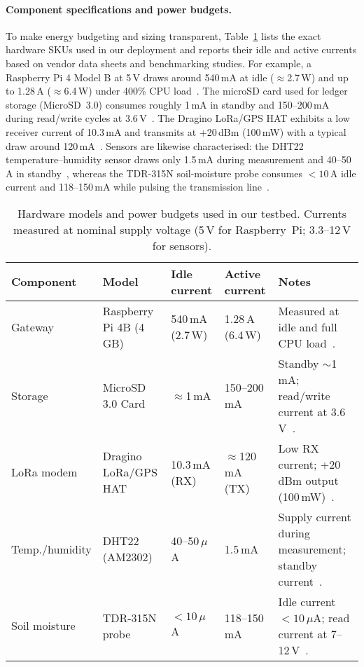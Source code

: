 \documentclass[12pt,onecolumn]{IEEEtran} %
\begin{document}
\paragraph{Component specifications and power budgets.}
To make energy budgeting and sizing transparent, Table~\ref{tab:hw} lists the exact hardware SKUs used in our deployment and reports their idle and active currents based on vendor data sheets and benchmarking studies. For example, a Raspberry Pi 4 Model B at 5\,V draws around 540\,mA at idle ($\approx$2.7\,W) and up to 1.28\,A ($\approx$6.4\,W) under 400\% CPU load~\cite{geerling2020powerbench}. The microSD card used for ledger storage (MicroSD~3.0) consumes roughly 1\,mA in standby and 150–200\,mA during read/write cycles at 3.6\,V~\cite{sanmina2017microsd}. The Dragino LoRa/GPS HAT exhibits a low receiver current of 10.3\,mA and transmits at +20\,dBm (100\,mW) with a typical draw around 120\,mA~\cite{dragino2019lorahat}. Sensors are likewise characterised: the DHT22 temperature–humidity sensor draws only 1.5\,mA during measurement and 40–50\,\textmu A in standby~\cite{dht22datasheet}, whereas the TDR-315N soil-moisture probe consumes $<10$\,\textmu A idle current and 118–150\,mA while pulsing the transmission line~\cite{acclima2017tdr315n}.

\begingroup
\setlength{\tabcolsep}{4pt}\footnotesize
\begin{table}[!t]
  \centering
  \caption{Hardware models and power budgets used in our testbed. Currents measured at nominal supply voltage (5\,V for Raspberry~Pi; 3.3--12\,V for sensors).}
  \label{tab:hw}
  \begin{tabularx}{\textwidth}{l l l l X}
    \toprule
    \textbf{Component} & \textbf{Model} & \textbf{Idle current} & \textbf{Active current} & \textbf{Notes} \\
    \midrule
    Gateway & Raspberry Pi 4B (4\,GB) & 540\,mA (2.7\,W) & 1.28\,A (6.4\,W) & Measured at idle and full CPU load~\cite{geerling2020powerbench}. \\
    Storage & MicroSD 3.0 Card & $\approx$1\,mA & 150--200\,mA & Standby $\sim$1\,mA; read/write current at 3.6\,V~\cite{sanmina2017microsd}. \\
    LoRa modem & Dragino LoRa/GPS HAT & 10.3\,mA (RX) & $\approx$120\,mA (TX) & Low RX current; +20\,dBm output (100\,mW)~\cite{dragino2019lorahat}. \\
    Temp./humidity & DHT22 (AM2302) & 40--50\,$\mu$A & 1.5\,mA & Supply current during measurement; standby current~\cite{dht22datasheet}. \\
    Soil moisture & TDR-315N probe & $<10\,\mu$A & 118--150\,mA & Idle current $<10\,\mu$A; read current at 7--12\,V~\cite{acclima2017tdr315n}. \\
    \bottomrule
  \end{tabularx}
\end{table}
\endgroup
\end{document}
